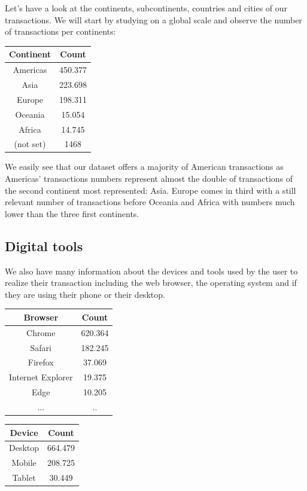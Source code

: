 \documentclass[a4paper, 12pt, one column]{article}
\begin{document}
Let's have a look at the continents, subcontinents, countries and cities of our transactions. We will start by studying on a global scale and observe the number of transactions per continents: 

\begin{center}
\begin{tabular}{ |c|c| } 
 \hline
 \textbf{Continent} & \textbf{Count} \\ 
 \hline
Americas & 450.377\\
Asia & 223.698\\
Europe & 198.311 \\
Oceania & 15.054 \\
Africa & 14.745 \\
(not set) & 1468 \\
 \hline
\end{tabular}
\end{center}

We easily see that our dataset offers a majority of American transactions as Americas' transactions numbers represent almost the double of transactions of the second continent most represented: Asia. Europe comes in third with a still relevant number of transactions before Oceania and Africa with numbers much lower than the three first continents.

\subsection{Digital tools}
We also have many information about the devices and tools used by the user to realize their transaction including the web browser, the operating system and if they are using their phone or their desktop. 

\begin{center}
\begin{tabular}{ |c|c| } 
 \hline
 \textbf{Browser} & \textbf{Count} \\ 
 \hline
Chrome & 620.364 \\
Safari & 182.245 \\
Firefox & 37.069 \\ 
Internet Explorer & 19.375 \\
Edge & 10.205 \\ 
... & .. \\
 \hline
\end{tabular}
\end{center}

\begin{center}
\begin{tabular}{ |c|c| } 
 \hline
 \textbf{Device} & \textbf{Count} \\ 
 \hline
Desktop & 664.479\\
Mobile & 208.725\\
Tablet & 30.449 \\
 \hline
\end{tabular}
\end{center}
\end{document}
